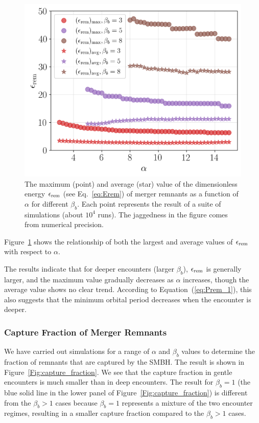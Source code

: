 \documentclass[twocolumn]{aastex631}
\begin{document}
\begin{figure}[htbp]
 \centering
\includegraphics[width=1.02\columnwidth]{figures/Epsilon.png}
\caption{
The maximum (point) and average (star) value of the dimensionless energy $\epsilon_{\rm rem}$ (see Eq.~\ref{eq:Erem}) of merger remnants as a function of $\alpha$ for different $\beta_b$.
Each point represents the result of a suite of simulations (about $10^4$ runs).
The jaggedness in the figure comes from numerical precision. } 
\label{Fig:Epsilon}
\end{figure}

Figure~\ref{Fig:Epsilon} shows the relationship of both the largest and average values of $\epsilon_{\rm rem}$ with respect to $\alpha$. 

The results indicate that for deeper encounters (larger $\beta_b$), $\epsilon_{\rm rem}$ is generally larger, and the maximum value gradually decreases as $\alpha$ increases, though the average value shows no clear trend. 
According to Equation~(\ref{eq:Prem_1}), this also suggests that the minimum orbital period decreases when the encounter is deeper.


\subsubsection{Capture Fraction of Merger Remnants}
\label{sec:property_capture}

We have carried out simulations for a range of $\alpha$ and $\beta_b$ values to determine the fraction of remnants that are captured by the SMBH.
The result is shown in Figure~\ref{Fig:capture_fraction}.
We see that the capture fraction
in gentle encounters is much smaller than in deep encounters.
The result for $\beta_b = 1$ (the blue solid line in the lower panel of Figure~\ref{Fig:capture_fraction}) is different from the $\beta_b > 1$ cases because $\beta_b = 1$ represents a mixture of the two encounter regimes, resulting in a smaller capture fraction compared to the $\beta_b > 1$ cases.
\end{document}
